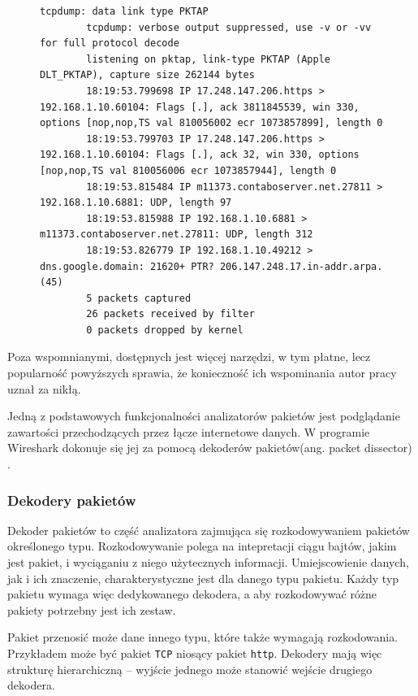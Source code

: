 \documentclass[a4paper, 11pt, twoside, openright]{article}
\begin{document}
	\begin{figure}[h]

		\begin{lstlisting}[style=CStyle,caption={Przykładowy wynik użycia programu \texttt{tcpdump}},label={lst:tcpdump}]
		tcpdump: data link type PKTAP
		tcpdump: verbose output suppressed, use -v or -vv for full protocol decode
		listening on pktap, link-type PKTAP (Apple DLT_PKTAP), capture size 262144 bytes
		18:19:53.799698 IP 17.248.147.206.https > 192.168.1.10.60104: Flags [.], ack 3811845539, win 330, options [nop,nop,TS val 810056002 ecr 1073857899], length 0
		18:19:53.799703 IP 17.248.147.206.https > 192.168.1.10.60104: Flags [.], ack 32, win 330, options [nop,nop,TS val 810056006 ecr 1073857944], length 0
		18:19:53.815484 IP m11373.contaboserver.net.27811 > 192.168.1.10.6881: UDP, length 97
		18:19:53.815988 IP 192.168.1.10.6881 > m11373.contaboserver.net.27811: UDP, length 312
		18:19:53.826779 IP 192.168.1.10.49212 > dns.google.domain: 21620+ PTR? 206.147.248.17.in-addr.arpa. (45)
		5 packets captured
		26 packets received by filter
		0 packets dropped by kernel \end{lstlisting}

	\end{figure}


	Poza wspomnianymi, dostępnych jest więcej narzędzi, w tym płatne, lecz popularność powyższych sprawia,
	że konieczność ich wspominania autor pracy uznał za nikłą.

	Jedną z podstawowych funkcjonalności analizatorów pakietów jest podglądanie zawartości przechodzących przez łącze internetowe danych.
	W programie Wireshark dokonuje się jej za pomocą dekoderów pakietów(ang. packet dissector) \cite{PAP}.

	\subsubsection{Dekodery pakietów}

	\indent\par
	Dekoder pakietów to część analizatora zajmująca się rozkodowywaniem pakietów określonego typu. Rozkodowywanie polega na intepretacji
	ciągu bajtów, jakim jest pakiet, i wyciąganiu z niego użytecznych informacji. Umiejscowienie danych, jak i ich znaczenie,
	charakterystyczne jest dla danego typu pakietu. Każdy typ pakietu wymaga więc dedykowanego dekodera, a aby rozkodowywać
	różne pakiety potrzebny jest ich zestaw.

	Pakiet przenosić może dane innego typu, które także wymagają rozkodowania. Przykładem może być pakiet \texttt{TCP} niosący pakiet
	\texttt{http}. Dekodery mają więc strukturę hierarchiczną -- wyjście jednego może stanowić wejście drugiego dekodera.
\end{document}
